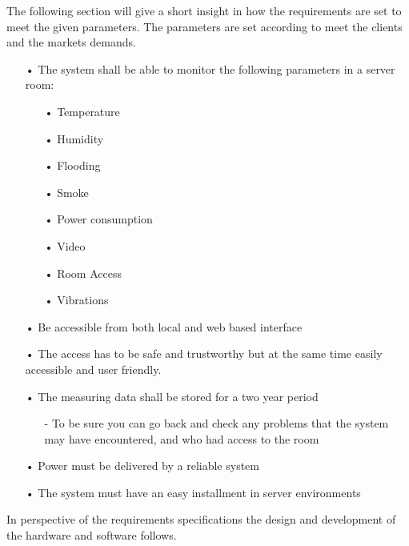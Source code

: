 The following section will give a short insight in how the requirements are set to meet the given parameters. The parameters are set according to meet the clients and the markets demands. 
\begin{enumerate}
	\item[•]The system shall be able to monitor the following parameters in a server room:
	\begin{enumerate}
		\item[•]Temperature
		\item[•]Humidity
		\item[•]Flooding
		\item[•]Smoke
		\item[•]Power consumption
		\item[•]Video
		\item[•]Room Access
		\item[•]Vibrations
	\end{enumerate}
	\item[•]Be accessible from both local and web based interface
	\item[•]The access has to be safe and trustworthy but at the same time easily accessible and user friendly.
	\item[•]The measuring data shall be stored for a two year period
	\begin{enumerate}
		\item[-]To be sure you can go back and check any problems that the system may have encountered, and who had access to the room
	\end{enumerate}
	\item[•]Power must be delivered by a reliable system
	\item[•]The system must have an easy installment in server environments
\end{enumerate}
In perspective of the requirements specifications the design and development of the hardware and software follows. 